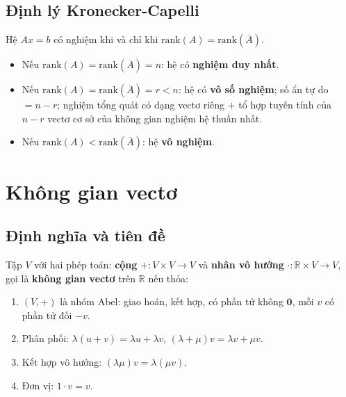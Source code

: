 \documentclass[12pt,a4paper]{article}
\begin{document}
\subsection{Định lý Kronecker-Capelli}

\begin{dinhly}[title={Định lý Kronecker-Capelli}]
  Hệ $Ax = b$ có nghiệm khi và chỉ khi $\mathrm{rank}(A) = \mathrm{rank}(\overline{A})$.
  \begin{itemize}
    \item Nếu $\mathrm{rank}(A) = \mathrm{rank}(\overline{A}) = n$: hệ có \textbf{nghiệm duy nhất}.
    \item Nếu $\mathrm{rank}(A) = \mathrm{rank}(\overline{A}) = r < n$: hệ có \textbf{vô số nghiệm}; số ẩn tự do $= n - r$; nghiệm tổng quát có dạng vectơ riêng + tổ hợp tuyến tính của $n-r$ vectơ cơ sở của không gian nghiệm hệ thuần nhất.
    \item Nếu $\mathrm{rank}(A) < \mathrm{rank}(\overline{A})$: hệ \textbf{vô nghiệm}.
  \end{itemize}
\end{dinhly}

\section{Không gian vectơ}

\subsection{Định nghĩa và tiên đề}

\begin{dinhnghia}
  Tập $V$ với hai phép toán: \textbf{cộng} $+: V \times V \to V$ và \textbf{nhân vô hướng} $\cdot: \mathbb{R} \times V \to V$, gọi là \textbf{không gian vectơ} trên $\mathbb{R}$ nếu thỏa:
  \begin{enumerate}
    \item $(V, +)$ là nhóm Abel: giao hoán, kết hợp, có phần tử không $\mathbf{0}$, mỗi $v$ có phần tử đối $-v$.
    \item Phân phối: $\lambda(u + v) = \lambda u + \lambda v$, $(\lambda + \mu)v = \lambda v + \mu v$.
    \item Kết hợp vô hướng: $(\lambda\mu)v = \lambda(\mu v)$.
    \item Đơn vị: $1 \cdot v = v$.
  \end{enumerate}
\end{dinhnghia}
\end{document}
